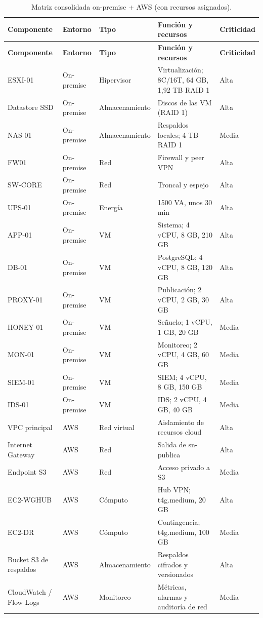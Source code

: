 {\small
\begin{longtable}{L{2.6cm}L{2cm}L{2.2cm}L{4.4cm}L{1.6cm}}
\caption{Matriz consolidada on-premise + AWS (con recursos asignados).}\label{tab:ce03-componentes-dc}\\
\toprule
\textbf{Componente} & \textbf{Entorno} & \textbf{Tipo} & \textbf{Función y recursos} & \textbf{Criticidad} \\
\midrule
\endfirsthead
\toprule
\textbf{Componente} & \textbf{Entorno} & \textbf{Tipo} & \textbf{Función y recursos} & \textbf{Criticidad} \\
\midrule
\endhead
\bottomrule
\endlastfoot
ESXI-01 & On-premise & Hipervisor & Virtualización; 8C/16T, 64 GB, 1,92 TB RAID 1 & Alta \\
Datastore SSD & On-premise & Almacenamiento & Discos de las VM (RAID 1) & Alta \\
NAS-01 & On-premise & Almacenamiento & Respaldos locales; 4 TB RAID 1 & Media \\
FW01 & On-premise & Red & Firewall y peer VPN & Alta \\
SW-CORE & On-premise & Red & Troncal y espejo & Alta \\
UPS-01 & On-premise & Energía & 1500 VA, unos 30 min & Alta \\
APP-01 & On-premise & VM & Sistema; 4 vCPU, 8 GB, 210 GB & Alta \\
DB-01 & On-premise & VM & PostgreSQL; 4 vCPU, 8 GB, 120 GB & Alta \\
PROXY-01 & On-premise & VM & Publicación; 2 vCPU, 2 GB, 30 GB & Alta \\
HONEY-01 & On-premise & VM & Señuelo; 1 vCPU, 1 GB, 20 GB & Media \\
MON-01 & On-premise & VM & Monitoreo; 2 vCPU, 4 GB, 60 GB & Media \\
SIEM-01 & On-premise & VM & SIEM; 4 vCPU, 8 GB, 150 GB & Media \\
IDS-01 & On-premise & VM & IDS; 2 vCPU, 4 GB, 40 GB & Media \\
VPC principal & AWS & Red virtual & Aislamiento de recursos cloud & Alta \\
Internet Gateway & AWS & Red & Salida de sn-publica & Alta \\
Endpoint S3 & AWS & Red & Acceso privado a S3 & Media \\
EC2-WGHUB & AWS & Cómputo & Hub VPN; t4g.medium, 20 GB & Alta \\
EC2-DR & AWS & Cómputo & Contingencia; t4g.medium, 100 GB & Media \\
Bucket S3 de respaldos & AWS & Almacenamiento & Respaldos cifrados y versionados & Alta \\
CloudWatch / Flow Logs & AWS & Monitoreo & Métricas, alarmas y auditoría de red & Media \\
\end{longtable}
}

